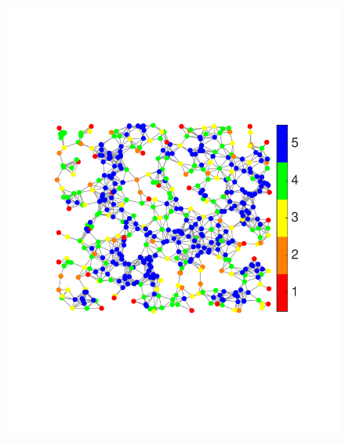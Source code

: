 \documentclass[journal, 10pt]{IEEEtran}
\begin{document}
\begin{figure}[tb]
\begin{minipage}[m]{0.43\linewidth}
\centerline{\includegraphics[width=.98\linewidth]{fig_uniq_part_sensor3}}
\end{minipage}
\hspace{.003\linewidth}
\begin{minipage}[m]{0.05\linewidth}

\end{minipage}
\end{figure}
\end{document}
